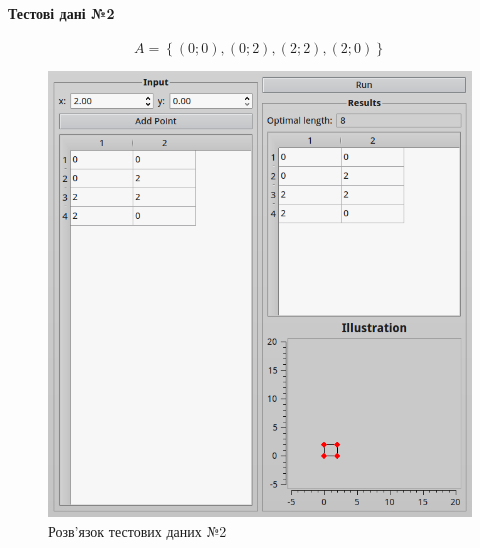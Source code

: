 \documentclass[utf8,ukrainian]{eskdtext}
\begin{document}
\paragraph{Тестові дані №2}
\begin{equation}
  A = \left\{ \left( 0; 0 \right), \left( 0; 2 \right), \left( 2; 2
  \right), \left( 2; 0 \right) \right\}
  \label{eq:t2}
\end{equation}
\begin{figure}[h!]
  \centering
  \includegraphics[width=\textwidth]{scr2.png}
  \caption{Розв’язок тестових даних №2}
  \label{fig:f2}
\end{figure}
\end{document}
